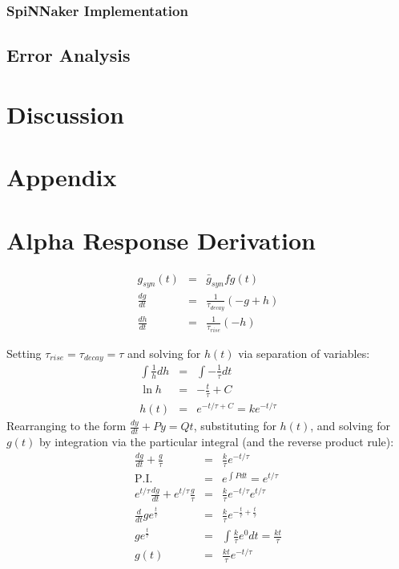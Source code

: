 \documentclass[12pt]{article}
\begin{document}
\subsubsection*{SpiNNaker Implementation}

\subsection{Error Analysis}

\section{Discussion}


\section{Appendix}
\appendix
\section{Alpha Response Derivation}
\begin{eqnarray}
g_{syn}(t) & = & \bar{g}_{syn}fg(t) \nonumber \\
\frac{dg}{dt} & = & \frac{1}{\tau_{decay}} (-g + h) \nonumber \\
\frac{dh}{dt} & = & \frac{1}{\tau_{rise}}(-h) \nonumber
\end{eqnarray}

Setting $\tau_{rise}=\tau_{decay} = \tau$ and solving for $h(t)$ via separation
of variables:
\begin{eqnarray}
\int \frac{1}{h} dh & = & \int -\frac{1}{\tau}dt \nonumber \\
\ln{h}&=&-\frac{t}{\tau} + C \nonumber \\
h(t) & = & e^{-{t/\tau}+C} = ke^{-t / \tau} \nonumber
\end{eqnarray}
Rearranging to the form $\frac{dy}{dt} +Py = Qt$, substituting  for $h(t)$, and
solving for $g(t)$ by integration via the particular integral (and the reverse
product rule):
\begin{eqnarray}
\frac{dg}{dt} + \frac{g}{\tau}&=&\frac{k}{\tau}e^{-t/\tau} \nonumber\\
\mathrm{P.I.}&=& e^{\int P dt} = e^{t/ \tau} \nonumber \\
e^{t/\tau}\frac{dg}{dt} + e^{t/\tau}\frac{g}{\tau}
&=& \frac{k}{\tau}e^{-t/\tau}e^{t/\tau} \nonumber \\
\frac{d}{dt} g e^{\frac{t}{\tau}}&=&\frac{k}{\tau}e^{-\frac{t}{\tau}
+\frac{t}{\tau}} \nonumber \\
g e^{\frac{t}{\tau}} &=& \int \frac{k}{\tau}e^0 dt = \frac{kt}{\tau} \nonumber \\
g(t)&=&\frac{kt}{\tau}e^{-t/\tau}
\end{eqnarray}




\end{document}
